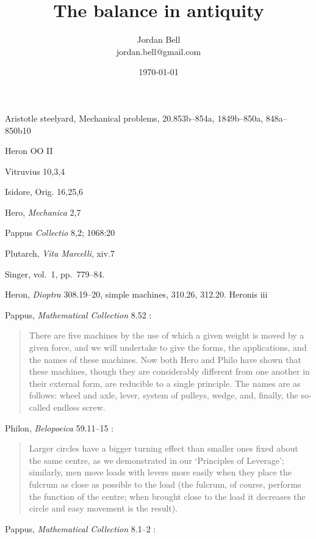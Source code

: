 \documentclass{article}
\title{The balance in antiquity}
\author{Jordan Bell\\ jordan.bell@gmail.com}
\date{\today}
\begin{document}
\maketitle

Aristotle steelyard, Mechanical problems, 20.853b--854a, 1849b--850a, 848a--850b10

Heron OO II

Vitruvius 10,3,4

Isidore, Orig. 16,25,6

Hero, {\em Mechanica} 2,7

Pappus {\em Collectio} 8,2; 1068:20

Plutarch, {\em Vita Marcelli}, xiv.7


Singer, vol.~1, pp.~779--84.

Heron, {\em Dioptra} 308.19--20, simple machines, 310.26, 312.20. Heronis iii


Pappus, {\em Mathematical Collection} 8.52 \cite[p.~49]{humphrey}:

\begin{quote}
There are five machines by the use of which a given weight is moved by a
given force, and we will undertake to give the forms, the applications, and the
names of these machines. Now both Hero and Philo have shown that these
machines, though they are considerably different from one another in their
external form, are reducible to a single principle. The names are as follows:
wheel and axle, lever, system of pulleys, wedge, and, finally, the so-called
endless screw.
\end{quote}

Philon, {\em Belopoeica} 59.11--15 \cite[p.~123]{marsden}:

\begin{quote}
Larger circles have a bigger turning effect than smaller ones fixed about
the same centre, as we  demonstrated in our `Principles of Leverage'; 
similarly, men move loads with levers more easily when they place the
fulcrum as close as possible to the load (the fulcrum, of course, performs
the function of the centre; when brought close to the load it decreases the
circle and easy movement is the result).
\end{quote}


Pappus, {\em Mathematical Collection} 8.1--2 \cite[pp.~47--48]{humphrey}:
\end{document}
